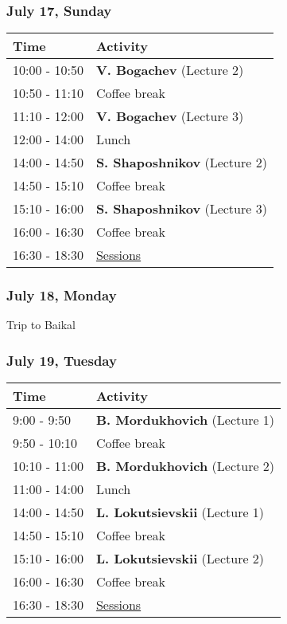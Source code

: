 \documentclass[
]{article}
\begin{document}
\hypertarget{july-17-sunday}{%
\subsubsection{July 17, Sunday}\label{july-17-sunday}}

\begin{longtable}[]{@{}ll@{}}
\toprule()
Time & Activity \\
\midrule()
\endhead
10:00 - 10:50 & \textbf{V. Bogachev} (Lecture 2) \\
10:50 - 11:10 & Coffee break \\
11:10 - 12:00 & \textbf{V. Bogachev} (Lecture 3) \\
12:00 - 14:00 & Lunch \\
14:00 - 14:50 & \textbf{S. Shaposhnikov} (Lecture 2) \\
14:50 - 15:10 & Coffee break \\
15:10 - 16:00 & \textbf{S. Shaposhnikov} (Lecture 3) \\
16:00 - 16:30 & Coffee break \\
16:30 - 18:30 & \protect\hyperlink{se}{Sessions} \\
\bottomrule()
\end{longtable}

\hypertarget{july-18-monday}{%
\subsubsection{July 18, Monday}\label{july-18-monday}}

Trip to Baikal

\hypertarget{july-19-tuesday}{%
\subsubsection{July 19, Tuesday}\label{july-19-tuesday}}

\begin{longtable}[]{@{}ll@{}}
\toprule()
Time & Activity \\
\midrule()
\endhead
9:00 - 9:50 & \textbf{B. Mordukhovich} (Lecture 1) \\
9:50 - 10:10 & Coffee break \\
10:10 - 11:00 & \textbf{B. Mordukhovich} (Lecture 2) \\
11:00 - 14:00 & Lunch \\
14:00 - 14:50 & \textbf{L. Lokutsievskii} (Lecture 1) \\
14:50 - 15:10 & Coffee break \\
15:10 - 16:00 & \textbf{L. Lokutsievskii} (Lecture 2) \\
16:00 - 16:30 & Coffee break \\
16:30 - 18:30 & \protect\hyperlink{se}{Sessions} \\
\bottomrule()
\end{longtable}
\end{document}
